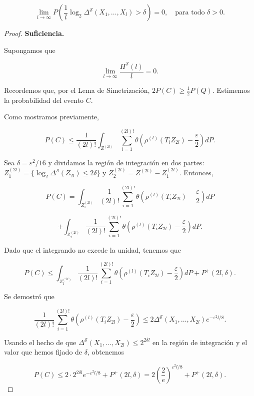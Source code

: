 \documentclass{report}
\begin{document}
\begin{equation}
    \lim_{l \to \infty} P\left( \frac{1}{l}\log_2 \Delta^{\mathcal{S}}(X_1, \dots, X_l) > \delta  \right) = 0, 
    \quad \text{para todo } \delta > 0.
\end{equation}
\begin{proof}


\textbf{Suficiencia.} 

Supongamos que

\[
\lim_{l \to \infty} \frac{H^{\mathcal{S}}(l)}{l} = 0.
\]

Recordemos que, por el Lema de Simetrización, \( 2P(C) \geq \frac{1}{2} P(Q) \). Estimemos la probabilidad del evento \( C \).\newline

Como mostramos previamente,

\[
P(C) \leq \frac{1}{(2l)!} \int_{Z^{(2l)}} \sum_{i=1}^{(2l)!} \theta \left( \rho^{(l)}(T_i Z_{2l}) - \frac{\varepsilon}{2} \right) dP.
\]

Sea \( \delta = \varepsilon^2 / 16 \) y dividamos la región de integración en dos partes: 
\( Z_1^{(2l)} = \{ \log_2 \Delta^{\mathcal{S}}(Z_{2l}) \leq 2\delta \} \) y 
\( Z_2^{(2l)} = Z^{(2l)} - Z_1^{(2l)} \). Entonces,

\[
P(C) = \int_{Z_1^{(2l)}} \frac{1}{(2l)!} \sum_{i=1}^{(2l)!} \theta \left( \rho^{(l)}(T_i Z_{2l}) - \frac{\varepsilon}{2} \right) dP
\]

\[
+ \int_{Z_2^{(2l)}} \frac{1}{(2l)!} \sum_{i=1}^{(2l)!} \theta \left( \rho^{(l)}(T_i Z_{2l}) - \frac{\varepsilon}{2} \right) dP.
\]

Dado que el integrando no excede la unidad, tenemos que

\[
P(C) \leq \int_{Z_1^{(2l)}} \frac{1}{(2l)!} \sum_{i=1}^{(2l)!} \theta \left( \rho^{(l)}(T_i Z_{2l}) - \frac{\varepsilon}{2} \right) dP + P^+(2l, \delta).
\]

Se demostró que

\[
\frac{1}{(2l)!} \sum_{i=1}^{(2l)!} \theta \left( \rho^{(l)}(T_i Z_{2l}) - \frac{\varepsilon}{2} \right) \leq 2 \Delta^{\mathcal{S}}(X_1, \dots, X_{2l}) e^{-\varepsilon^2 l / 8}.
\]

Usando el hecho de que \( \Delta^{\mathcal{S}}(X_1, \dots, X_{2l}) \leq 2^{2\delta l} \) en la región de integración y el valor que hemos
fijado de $\delta$, obtenemos

\[
P(C) \leq 2 \cdot 2^{2\delta l} e^{-\varepsilon^2 l / 8} + P^+(2l, \delta) = 2\left(\frac{2}{e}\right)^{\varepsilon^2 l / 8} + P^+(2l, \delta).
\]


\end{proof}
\end{document}
